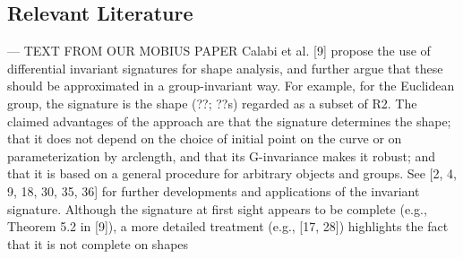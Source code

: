 \documentclass[review,onefignum,onetabnum]{siamonline190516}
\begin{document}
\subsection{Relevant Literature}
---
TEXT FROM OUR MOBIUS PAPER
Calabi et al. [9] propose the use of differential invariant signatures for shape analysis, and further
argue that these should be approximated in a group-invariant way. For example, for the Euclidean
group, the signature is the shape  (??; ??s) regarded as a subset of R2. The claimed advantages
of the approach are that the signature determines the shape; that it does not depend on the
choice of initial point on the curve or on parameterization by arclength, and that its G-invariance
makes it robust; and that it is based on a general procedure for arbitrary objects and groups.
See [2, 4, 9, 18, 30, 35, 36] for further developments and applications of the invariant signature.
Although the signature at first sight appears to be complete (e.g., Theorem 5.2 in [9]),
a more detailed treatment (e.g., [17, 28]) highlights the fact that it is not complete on shapes
\end{document}
